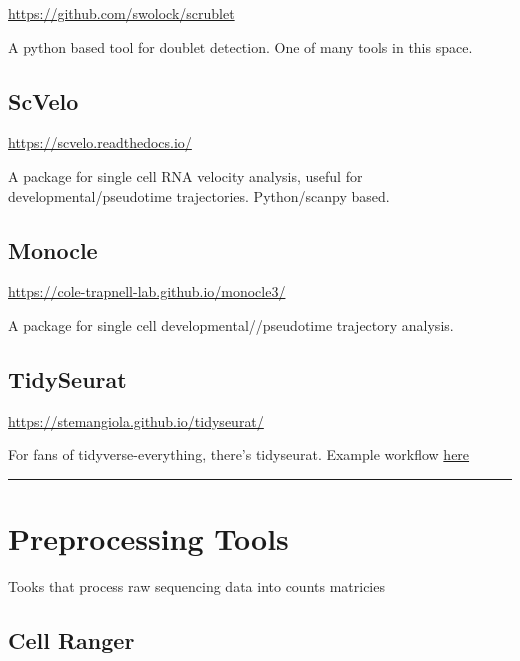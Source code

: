 \documentclass[
]{book}
\begin{document}
\url{https://github.com/swolock/scrublet}

A python based tool for doublet detection. One of many tools in this space.

\hypertarget{scvelo}{%
\subsection*{ScVelo}\label{scvelo}}

\url{https://scvelo.readthedocs.io/}

A package for single cell RNA velocity analysis, useful for developmental/pseudotime trajectories. Python/scanpy based.

\hypertarget{monocle}{%
\subsection*{Monocle}\label{monocle}}

\url{https://cole-trapnell-lab.github.io/monocle3/}

A package for single cell developmental//pseudotime trajectory analysis.

\hypertarget{tidyseurat}{%
\subsection*{TidySeurat}\label{tidyseurat}}

\url{https://stemangiola.github.io/tidyseurat/}

For fans of tidyverse-everything, there's tidyseurat. Example workflow \href{https://tidytranscriptomics-workshops.github.io/bioc2022_tidytranscriptomics/articles/tidytranscriptomics_case_study.html}{here}

\begin{center}\rule{0.5\linewidth}{0.5pt}\end{center}

\hypertarget{preprocessing-tools}{%
\section{Preprocessing Tools}\label{preprocessing-tools}}

Tooks that process raw sequencing data into counts matricies

\hypertarget{cell-ranger}{%
\subsection*{Cell Ranger}\label{cell-ranger}}
\end{document}
